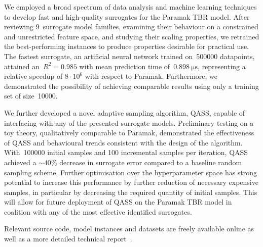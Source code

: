 We employed a broad spectrum of data
analysis and machine learning techniques to develop fast and high-quality
surrogates for the Paramak TBR model. After reviewing
9~surrogate model families, examining their behaviour on a constrained and
unrestricted feature space, and studying their scaling properties, we retrained
the best-performing instances to produce properties desirable for
practical use. The fastest surrogate, an artificial neural network trained
on~\num{500000} datapoints, attained an~$R^2=\num{0.985}$ with mean prediction time
of~$\SI{0.898}{\micro\second}$, representing a relative
speedup of $8\cdot 10^6$ with respect to Paramak. Furthermore, we demonstrated the possibility of achieving comparable results using only a
training set of size~\num{10000}.

We further developed a novel adaptive
sampling algorithm, QASS, capable of interfacing with any of the presented
surrogate models.
Preliminary testing on a toy theory, qualitatively comparable to
Paramak, demonstrated the effectiveness of QASS and behavioural trends
consistent with the design of the algorithm. With~\num{100000} initial samples
and 100 incremental samples per iteration, QASS achieved a ${\sim}40\%$ decrease
in surrogate error compared to a baseline random sampling scheme. Further optimisation over the hyperparameter space has strong potential to increase this performance by further reduction of necessary expensive samples, in particular by decreasing the required quantity of initial samples. This will allow for future deployment of QASS on the Paramak TBR model in coalition with any of the most effective identified surrogates.

Relevant source code, model instances and datasets are freely
available online as well as a more detailed technical
report~\cite{github,finalreport}.
